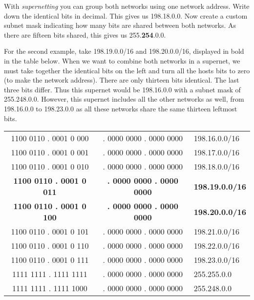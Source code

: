 {With \emph{supernetting} you can group both networks using one network address.
Write down the identical bits in decimal.
This gives us 198.18.0.0.
Now create a custom subnet mask indicating how many bits are shared between both networks.
As there are fifteen bits shared, this gives us 255.\textbf{254}.0.0.

For the second example, take 198.19.0.0/16 and 198.20.0.0/16, displayed in bold in the table below.
When we want to combine both networks in a supernet, we must take together the identical bits on the left and turn all the hosts bits to zero (to make the network address).
There are only thirteen bits identical. The last three bits differ.
Thus this supernet would be 198.16.0.0 with a subnet mask of 255.248.0.0.
However, this supernet includes all the other networks as well, from 198.16.0.0 to 198.23.0.0 as all these networks share the same thirteen leftmost bits.


\begin{center}
\sffamily
\begin{tabular}{c|cl}
\color{spot1} 1100 0110 . 0001 0\color{spot2} 000 & . 0000 0000 . 0000 0000 & 198.16.0.0/16 \\
\color{spot1} 1100 0110 . 0001 0\color{spot2} 001 & . 0000 0000 . 0000 0000 & 198.17.0.0/16 \\
\color{spot1} 1100 0110 . 0001 0\color{spot2} 010 & . 0000 0000 . 0000 0000 & 198.18.0.0/16 \\
\bfseries\color{spot1} 1100 0110 . 0001 0\bfseries\color{spot2} 011 & \bfseries . 0000 0000 . 0000 0000 & \bfseries198.19.0.0/16 \\
\bfseries\color{spot1} 1100 0110 . 0001 0\bfseries\color{spot2} 100 & \bfseries . 0000 0000 . 0000 0000 & \bfseries 198.20.0.0/16 \\
\color{spot1} 1100 0110 . 0001 0\color{spot2} 101 & . 0000 0000 . 0000 0000 & 198.21.0.0/16 \\
\color{spot1} 1100 0110 . 0001 0\color{spot2} 110 & . 0000 0000 . 0000 0000 & 198.22.0.0/16 \\
\color{spot1} 1100 0110 . 0001 0\color{spot2} 111 & . 0000 0000 . 0000 0000 & 198.23.0.0/16 \\
\hline
1111 1111 . 1111 1111 & . 0000 0000 . 0000 0000 & 255.255.0.0 \\
1111 1111 . 1111 1000 & . 0000 0000 . 0000 0000 & 255.248.0.0 \\
\end{tabular}
\end{center}
}

